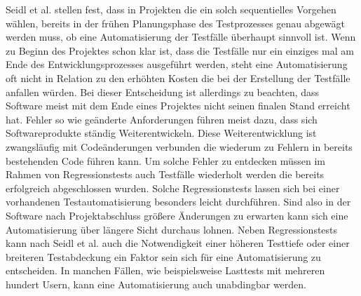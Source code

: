 Seidl et al. \cite[vgl. S.22]{seidl_basiswissen_2012} stellen fest, dass in Projekten die ein solch sequentielles Vorgehen wählen, bereits in der frühen Planungsphase des Testprozesses genau abgewägt werden muss, ob eine Automatisierung der Testfälle überhaupt sinnvoll ist.
Wenn zu Beginn des Projektes schon klar ist, dass die Testfälle nur ein einziges mal am Ende des Entwicklungsprozesses ausgeführt werden, steht eine Automatisierung oft nicht in Relation zu den erhöhten Kosten die bei der Erstellung der Testfälle anfallen würden.
Bei dieser Entscheidung ist allerdings zu beachten, dass Software meist mit dem Ende eines Projektes nicht seinen finalen Stand erreicht hat. Fehler so wie geänderte Anforderungen führen meist dazu, dass sich Softwareprodukte ständig Weiterentwickeln.
Diese Weiterentwicklung ist zwangsläufig mit Codeänderungen verbunden die wiederum zu Fehlern in bereits bestehenden Code führen kann.
Um solche Fehler zu entdecken müssen im Rahmen von Regressionstests auch Testfälle wiederholt werden die bereits erfolgreich abgeschlossen wurden.
Solche Regressionstests lassen sich bei einer vorhandenen Testautomatisierung besonders leicht durchführen. Sind also in der Software nach Projektabschluss größere Änderungen zu erwarten kann sich eine Automatisierung über längere Sicht durchaus lohnen.
Neben Regressionstests kann nach Seidl et al. \cite[vgl. S.23]{seidl_basiswissen_2012} auch die Notwendigkeit einer höheren Testtiefe oder einer breiteren Testabdeckung ein Faktor sein sich für eine Automatisierung zu entscheiden.
In manchen Fällen, wie beispielsweise Lasttests mit mehreren hundert Usern, kann eine Automatisierung auch unabdingbar werden.

